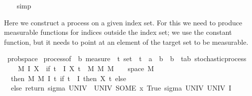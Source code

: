 \begin{isabellebody}
%
\isadelimproof
\ \ %
\endisadelimproof
%
\isatagproof
{}\isamarkupfalse%
\ simp%
\endisatagproof
{\isafoldproof}%
%
\isadelimproof
%
\endisadelimproof
%
\begin{isamarkuptext}%
Here we construct a process on a given index set. For this we need to produce measurable
  functions for indices outside the index set; we use the constant function, but it needs to point at
  an element of the target set to be measurable.%
\end{isamarkuptext}\isamarkuptrue%
\isamarkupfalse%
\ prob{\isacharunderscore}{\kern0pt}space\isanewline
{}\isanewline
\isanewline
{}\isamarkupfalse%
\ process{\isacharunderscore}{\kern0pt}of\ {\isacharcolon}{\kern0pt}{\isacharcolon}{\kern0pt}\ {\isachardoublequoteopen}{\isacharprime}{\kern0pt}b\ measure\ {\isasymRightarrow}\ {\isacharprime}{\kern0pt}t\ set\ {\isasymRightarrow}\ {\isacharparenleft}{\kern0pt}{\isacharprime}{\kern0pt}t\ {\isasymRightarrow}\ {\isacharprime}{\kern0pt}a\ {\isasymRightarrow}\ {\isacharprime}{\kern0pt}b{\isacharparenright}{\kern0pt}\ {\isasymRightarrow}\ {\isacharprime}{\kern0pt}b\ {\isasymRightarrow}\ {\isacharparenleft}{\kern0pt}{\isacharprime}{\kern0pt}t{\isacharcomma}{\kern0pt}{\isacharprime}{\kern0pt}a{\isacharcomma}{\kern0pt}{\isacharprime}{\kern0pt}b{\isacharparenright}{\kern0pt}\ stochastic{\isacharunderscore}{\kern0pt}process{\isachardoublequoteclose}\isanewline
\ \ \ {\isachardoublequoteopen}{\isasymlambda}\ M{\isacharprime}{\kern0pt}\ I\ X\ {\isasymomega}{\isachardot}{\kern0pt}\ if\ {\isacharparenleft}{\kern0pt}{\isasymforall}t\ {\isasymin}\ I{\isachardot}{\kern0pt}\ X\ t\ {\isasymin}\ M\ {\isasymrightarrow}\isactrlsub M\ M{\isacharprime}{\kern0pt}{\isacharparenright}{\kern0pt}\ {\isasymand}\ {\isasymomega}\ {\isasymin}\ space\ M{\isacharprime}{\kern0pt}\isanewline
\ \ then\ {\isacharparenleft}{\kern0pt}M{\isacharcomma}{\kern0pt}\ M{\isacharprime}{\kern0pt}{\isacharcomma}{\kern0pt}\ I{\isacharcomma}{\kern0pt}\ {\isacharparenleft}{\kern0pt}{\isasymlambda}t{\isachardot}{\kern0pt}\ if\ t\ {\isasymin}\ I\ then\ X\ t\ else\ {\isacharparenleft}{\kern0pt}{\isasymlambda}{\isacharunderscore}{\kern0pt}{\isachardot}{\kern0pt}\ {\isasymomega}{\isacharparenright}{\kern0pt}{\isacharparenright}{\kern0pt}{\isacharparenright}{\kern0pt}\isanewline
\ \ else\ {\isacharparenleft}{\kern0pt}return\ {\isacharparenleft}{\kern0pt}sigma\ UNIV\ {\isacharbraceleft}{\kern0pt}{\isacharbraceleft}{\kern0pt}{\isacharbraceright}{\kern0pt}{\isacharcomma}{\kern0pt}\ UNIV{\isacharbraceright}{\kern0pt}{\isacharparenright}{\kern0pt}\ {\isacharparenleft}{\kern0pt}SOME\ x{\isachardot}{\kern0pt}\ True{\isacharparenright}{\kern0pt}{\isacharcomma}{\kern0pt}\ sigma\ UNIV\ UNIV{\isacharcomma}{\kern0pt}\ I{\isacharcomma}{\kern0pt}\ {\isasymlambda}{\isacharunderscore}{\kern0pt}\ {\isacharunderscore}{\kern0pt}{\isachardot}{\kern0pt}\ {\isasymomega}{\isacharparenright}{\kern0pt}{\isachardoublequoteclose}\isanewline

\end{isabellebody}

